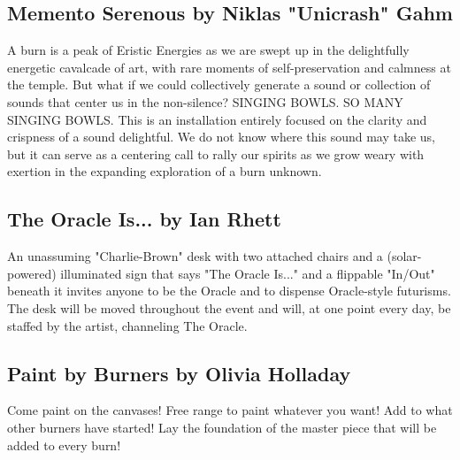 \begin{multicols}{2}
\subsection*{Memento Serenous        by Niklas "Unicrash" Gahm           }
A burn is a peak of Eristic Energies as we are swept up in the delightfully energetic cavalcade of art, with rare moments of self-preservation and calmness at the temple. But what if we could collectively generate a sound or collection of sounds that center us in the non-silence? SINGING BOWLS. SO MANY SINGING BOWLS. This is an installation entirely focused on the clarity and crispness of a sound delightful. We do not know where this sound may take us, but it can serve as a centering call to rally our spirits as we grow weary with exertion in the expanding exploration of a burn unknown.


\subsection*{The Oracle Is... by Ian Rhett                }
An unassuming "Charlie-Brown" desk with two attached chairs and a (solar-powered) illuminated sign that says "The Oracle Is..." and a flippable "In/Out" beneath it invites anyone to be the Oracle and to dispense Oracle-style futurisms. The desk will be moved throughout the event and will, at one point every day, be staffed by the artist, channeling The Oracle.


\subsection*{Paint by Burners by Olivia Holladay                }
Come paint on the canvases! Free range to paint whatever you want! Add to what other burners have started! Lay the foundation of the master piece that will be added to every burn!



\end{multicols}
